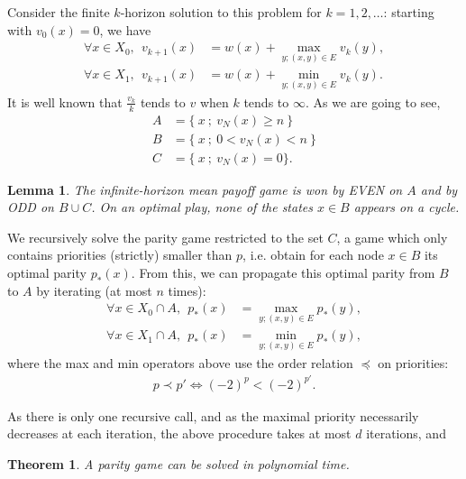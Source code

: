 \documentclass{article}
\newtheorem{theorem}{Theorem}
\newtheorem{lemma}{Lemma}
\begin{document}
Consider the finite $k$-horizon solution to this problem for $k=1,2,\dots$: starting with $v_0(x)=0$, we have
\begin{align}
  \forall x \in X_0, ~~v_{k+1}(x) & = w(x) + \max_{y;(x,y)\in E} v_k(y), \\
  \forall x \in X_1, ~~v_{k+1}(x) & = w(x) + \min_{y;(x,y)\in E} v_k(y).
\end{align}
It is well known that $\frac{v_k}{k}$ tends to $v$ when $k$ tends to $\infty$. As we are going to see, 
\begin{align}
 A &= \{~ x ~;~ v_N(x) \ge n ~\}\\
 B &= \{~ x ~;~ 0 < v_N(x) < n ~\}\\
 C & = \{~ x ~;~ v_N(x)=0 \}.
\end{align}
\begin{lemma}
  The infinite-horizon mean payoff game is won by EVEN on $A$ and by ODD on $B \cup C$. On an optimal play, none of the states $x \in B$ appears on a cycle. 
\end{lemma}

We recursively solve the parity game restricted to the set $C$, a game which only contains priorities (strictly) smaller than $p$, i.e. obtain for each node $x \in B$ its optimal parity $p_*(x)$. From this, we can propagate this optimal parity from $B$ to $A$ by iterating (at most $n$ times):
\begin{align}
  \forall x \in X_0 \cap A, ~~ p_*(x) &= \max_{y;(x,y)\in E} p_*(y), \\
  \forall x \in X_1 \cap A, ~~ p_*(x) &= \min_{y;(x,y)\in E} p_*(y),
\end{align}
where the max and min operators above use the order relation $\preceq$ on priorities:
\begin{align}
  p \prec p' \Leftrightarrow (-2)^{p}<(-2)^{p'}.  
\end{align}

As there is only one recursive call, and as the maximal priority necessarily decreases at each iteration, the above procedure takes at most $d$ iterations, and
\begin{theorem}
A parity game can be solved in polynomial time.
\end{theorem}



 
\end{document}

